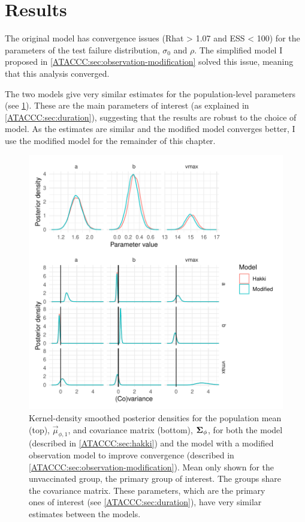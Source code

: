 \documentclass[thesis.tex]{subfiles}
\begin{document}
\section{Results} \label{ATACCC:sec:results}


The original \textcite{hakkiOnset} model has convergence issues (Rhat > 1.07 and ESS < 100) for the parameters of the test failure distribution, $\sigma_0$ and $\rho$.
The simplified model I proposed in \cref{ATACCC:sec:observation-modification} solved this issue, meaning that this analysis converged.

The two models give very similar estimates for the population-level parameters (see \cref{ATACCC:fig:compare-hakki-modified}).
These are the main parameters of interest (as explained in \cref{ATACCC:sec:duration}), suggesting that the results are robust to the choice of model.
As the estimates are similar and the modified model converges better, I use the modified model for the remainder of this chapter.
\begin{figure}
  \centering \includegraphics{ATACCC/compare_hakki_modified}
  \caption[Comparison of population-level parameters between models.]{Kernel-density smoothed posterior densities for the population mean (top), $\vec{\mu}_{\phi,1}$, and covariance matrix (bottom), $\bm{\Sigma}_\phi$, for both the \textcite{hakkiOnset} model (described in \cref{ATACCC:sec:hakki}) and the model with a modified observation model to improve convergence (described in \cref{ATACCC:sec:observation-modification}). Mean only shown for the unvaccinated group, the primary group of interest. The groups share the covariance matrix. These parameters, which are the primary ones of interest (see \cref{ATACCC:sec:duration}), have very similar estimates between the models. \label{ATACCC:fig:compare-hakki-modified}}
\end{figure}
\end{document}
